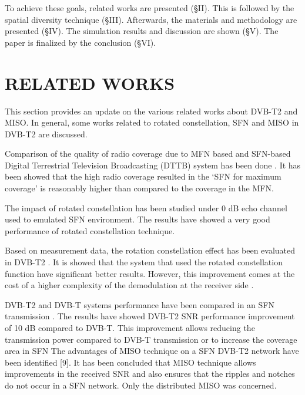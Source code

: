\documentclass[10pt, conference]{IEEEtran}
\begin{document}
\normalsize{
 \hspace{3em} 
 To achieve these goals, related works are presented (§II).
 This is followed by the spatial diversity technique (§III). Afterwards, the materials and methodology are presented (§IV). The simulation results and discussion are shown (§V). The paper is finalized by the conclusion (§VI).
}

\section{RELATED WORKS}    

\linespread{1.055}
\normalsize{
    \hspace{1em} This section provides an update on the various related works about DVB-T2 and MISO. In general, some works related to rotated constellation, SFN and MISO in DVB-T2 are discussed.
}

\normalsize{
    \hspace{1em} Comparison of the quality of radio coverage due to MFN based and SFN-based Digital Terrestrial Television Broadcasting (DTTB) system has been done \cite{5}. It has been showed that the high radio coverage resulted in the ‘SFN for maximum coverage’ is reasonably higher than compared to the coverage in the MFN.
}

\normalsize{
    \hspace{1em}  The impact of rotated constellation has been studied under 0 dB echo channel \cite{6} used to emulated SFN environment. The results have showed a very good performance of rotated constellation technique.
}

\normalsize{
    \hspace{1em} Based on measurement data, the rotation constellation effect has been evaluated in DVB-T2 \cite{7}. It is showed that the system that used the rotated constellation function have significant better results. However, this improvement comes at the cost of a higher complexity of the demodulation at the receiver side \cite{8}.
}

\normalsize{
    \hspace{1em} DVB-T2 and DVB-T systems performance have been compared in an SFN transmission \cite{1}. The results have showed DVB-T2 SNR performance improvement of 10 dB compared to DVB-T. This improvement allows reducing the transmission power compared to DVB-T transmission or to increase the coverage area in SFN
}
\linespread{0.95}
\normalsize{
    \hspace{1em} The advantages of MISO technique on a SFN DVB-T2 network have been identified [9]. It has been concluded that MISO technique allows improvements in the received SNR and also ensures that the ripples and notches do not occur in a SFN network. Only the distributed MISO was concerned.
}
\end{document}
